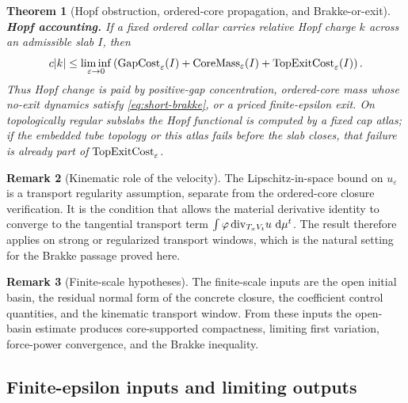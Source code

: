 \documentclass[11pt]{article}
\newtheorem{theorem}{Theorem}[section]
\theoremstyle{definition}
\newtheorem{remark}[theorem]{Remark}
\newcommand{\dd}{\,\mathrm d}
\newcommand{\eps}{\varepsilon}
\begin{document}
\begin{theorem}[Hopf obstruction, ordered-core propagation, and Brakke-or-exit]
\smallskip
\noindent\textbf{Hopf accounting.}
If a fixed ordered collar carries relative Hopf charge \(k\) across an
admissible slab \(I\), then
\begin{equation}\label{eq:short-hopf-cost}
        c|k|
        \le
        \liminf_{\eps\to0}
        \left(
        {\rm GapCost}_\eps(I)
        +
        {\rm CoreMass}_\eps(I)
        +
        {\rm TopExitCost}_\eps(I)
        \right).
\end{equation}
Thus Hopf change is paid by positive-gap concentration, ordered-core mass whose
no-exit dynamics satisfy \eqref{eq:short-brakke}, or a priced finite-epsilon
exit.  On topologically regular subslabs the Hopf functional is computed by a
fixed cap atlas; if the embedded tube topology or this atlas fails before the
slab closes, that failure is already part of \({\rm TopExitCost}_\eps\).
\end{theorem}

\begin{remark}[Kinematic role of the velocity]
The Lipschitz-in-space bound on \(u_\eps\) is a transport regularity assumption,
separate from the ordered-core closure verification.  It is the condition that
allows the material derivative identity to converge to the tangential transport
term \(\int\varphi\,{\rm div}_{T_xV_t}u\,\dd\mu^t\).  The result therefore
applies on strong or regularized transport windows, which is the natural setting
for the Brakke passage proved here.
\end{remark}

\begin{remark}[Finite-scale hypotheses]
The finite-scale inputs are the open initial basin, the residual normal form of
the concrete closure, the coefficient control quantities, and the kinematic transport
window.  From these inputs the open-basin estimate produces core-supported
compactness, limiting first variation, force-power convergence, and the Brakke
inequality.
\end{remark}

\subsection*{Finite-epsilon inputs and limiting outputs}
\end{document}
